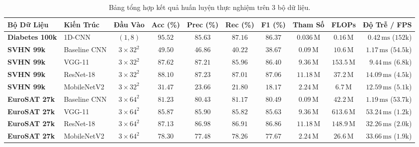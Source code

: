 \documentclass[12pt,a4paper]{report}
\begin{document}
\begin{table}[H]
\centering
\caption{Bảng tổng hợp kết quả huấn luyện thực nghiệm trên 3 bộ dữ liệu.}
\label{tab:chapter5_multi_domain_benchmark}
\footnotesize
\setlength{\tabcolsep}{2.5pt}
\begin{tabular*}{\textwidth}{@{\extracolsep{\fill}}llcccccccr@{}}
\toprule
\textbf{Bộ Dữ Liệu} & \textbf{Kiến Trúc} & \textbf{Đầu Vào} & \textbf{Acc (\%)} & \textbf{Prec (\%)} & \textbf{Rec (\%)} & \textbf{F1 (\%)} & \textbf{Tham Số} & \textbf{FLOPs} & \textbf{Độ Trễ / FPS} \\
\midrule
\textbf{Diabetes 100k} & 1D-CNN & $(1, 8)$ & $\mathbf{95.52}$ & $85.63$ & $\mathbf{87.16}$ & $\mathbf{86.37}$ & $0.036\,\text{M}$ & $0.16\,\text{M}$ & $0.42\,\text{ms}$ ($152\text{k}$) \\
\midrule
\textbf{SVHN 99k} & Baseline CNN & $3\times 32^2$ & $49.50$ & $46.86$ & $40.22$ & $38.67$ & $0.09\,\text{M}$ & $10.6\,\text{M}$ & $1.17\,\text{ms}$ ($54.5\text{k}$) \\
\textbf{SVHN 99k} & VGG-11 & $3\times 32^2$ & $87.62$ & $87.21$ & $85.96$ & $86.40$ & $9.36\,\text{M}$ & $153.5\,\text{M}$ & $9.44\,\text{ms}$ ($6.8\text{k}$) \\
\textbf{SVHN 99k} & ResNet-18 & $3\times 32^2$ & $\mathbf{88.10}$ & $\mathbf{87.23}$ & $\mathbf{87.01}$ & $\mathbf{87.06}$ & $11.18\,\text{M}$ & $37.2\,\text{M}$ & $14.09\,\text{ms}$ ($4.5\text{k}$) \\
\textbf{SVHN 99k} & MobileNetV2 & $3\times 32^2$ & $31.47$ & $23.66$ & $21.80$ & $18.17$ & $2.24\,\text{M}$ & $6.7\,\text{M}$ & $12.59\,\text{ms}$ ($5.1\text{k}$) \\
\midrule
\textbf{EuroSAT 27k} & Baseline CNN & $3\times 64^2$ & $81.23$ & $80.43$ & $81.17$ & $80.49$ & $0.09\,\text{M}$ & $42.2\,\text{M}$ & $1.19\,\text{ms}$ ($53.7\text{k}$) \\
\textbf{EuroSAT 27k} & VGG-11 & $3\times 64^2$ & $85.87$ & $85.90$ & $85.82$ & $85.63$ & $9.36\,\text{M}$ & $613.6\,\text{M}$ & $53.24\,\text{ms}$ ($1.2\text{k}$) \\
\textbf{EuroSAT 27k} & ResNet-18 & $3\times 64^2$ & $\mathbf{87.13}$ & $\mathbf{86.98}$ & $\mathbf{86.91}$ & $\mathbf{86.86}$ & $11.18\,\text{M}$ & $148.9\,\text{M}$ & $32.26\,\text{ms}$ ($2.0\text{k}$) \\
\textbf{EuroSAT 27k} & MobileNetV2 & $3\times 64^2$ & $78.30$ & $77.48$ & $78.26$ & $77.67$ & $2.24\,\text{M}$ & $26.6\,\text{M}$ & $33.66\,\text{ms}$ ($1.9\text{k}$) \\
\bottomrule
\end{tabular*}
\end{table}
\end{document}
